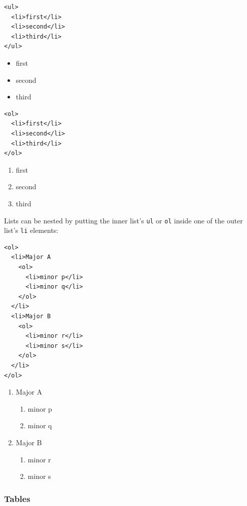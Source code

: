 \begin{verbatim}
<ul>
  <li>first</li>
  <li>second</li>
  <li>third</li>
</ul>
\end{verbatim}

\begin{itemize}
\tightlist
\item
  first
\item
  second
\item
  third
\end{itemize}

\begin{verbatim}
<ol>
  <li>first</li>
  <li>second</li>
  <li>third</li>
</ol>
\end{verbatim}

\begin{enumerate}
\tightlist
\item
  first
\item
  second
\item
  third
\end{enumerate}

Lists can be nested by putting the inner list's \texttt{ul} or
\texttt{ol} inside one of the outer list's \texttt{li} elements:

\begin{verbatim}
<ol>
  <li>Major A
    <ol>
      <li>minor p</li>
      <li>minor q</li>
    </ol>
  </li>
  <li>Major B
    <ol>
      <li>minor r</li>
      <li>minor s</li>
    </ol>
  </li>
</ol>
\end{verbatim}

\begin{enumerate}
\tightlist
\item
  Major A

  \begin{enumerate}
  \tightlist
  \item
    minor p
  \item
    minor q
  \end{enumerate}
\item
  Major B

  \begin{enumerate}
  \tightlist
  \item
    minor r
  \item
    minor s
  \end{enumerate}
\end{enumerate}

\subsubsection{Tables}\label{s:htmlcss-tables}

